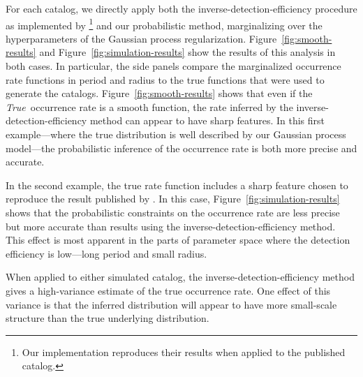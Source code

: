 \documentclass[12pt,preprint]{aastex}
\newcommand{\foreign}[1]{\emph{#1}}
\newcommand{\True}{\foreign{True}}
\newcommand{\figref}[1]{\ref{fig:#1}}
\newcommand{\Fig}[1]{Figure~\figref{#1}}
\newcommand{\fig}[1]{\Fig{#1}}
\begin{document}
For each catalog, we directly apply both the inverse-detection-efficiency
procedure as implemented by \citealt{petigura}\footnote{Our implementation
reproduces their results when applied to the published catalog.} and our
probabilistic method, marginalizing over the hyperparameters of the Gaussian
process regularization.
\Fig{smooth-results} and \fig{simulation-results} show the results of this
analysis in both cases.
In particular, the side panels compare the marginalized occurrence rate
functions in period and radius to the true functions that were used to
generate the catalogs.
\Fig{smooth-results} shows that even if the \True\ occurrence rate is a smooth
function, the rate inferred by the inverse-detection-efficiency method can
appear to have sharp features.
In this first example---where the true distribution is well described by our
Gaussian process model---the probabilistic inference of the occurrence rate is
both more precise and accurate.

In the second example, the true rate function includes a sharp feature chosen
to reproduce the result published by \citet{petigura}.
In this case, \fig{simulation-results} shows that the probabilistic
constraints on the occurrence rate are less precise but more accurate than
results using the inverse-detection-efficiency method.
This effect is most apparent in the parts of parameter space where the
detection efficiency is low---long period and small radius.

When applied to either simulated catalog, the inverse-detection-efficiency
method gives a high-variance estimate of the true occurrence rate.
One effect of this variance is that the inferred distribution will appear to
have more small-scale structure than the true underlying distribution.
\end{document}
